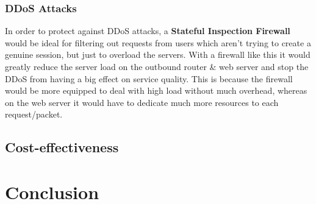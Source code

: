 \documentclass[11pt]{article}
\begin{document}
        \subsubsection{DDoS Attacks}
          In order to protect against DDoS attacks, a \textbf{Stateful Inspection Firewall} would be ideal for filtering out requests from users which aren't trying to create a genuine session, but just to overload the servers. With a firewall like this it would greatly reduce the server load on the outbound router \& web server and stop the DDoS from having a big effect on service quality. This is because the firewall would be more equipped to deal with high load without much overhead, whereas on the web server it would have to dedicate much more resources to each request/packet.

      \subsection{Cost-effectiveness}

    \section{Conclusion}

  \newpage

  
  
\end{document}

